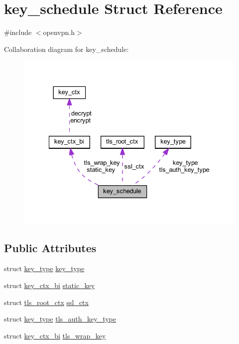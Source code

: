 \hypertarget{structkey__schedule}{}\section{key\+\_\+schedule Struct Reference}
\label{structkey__schedule}


{\ttfamily \#include $<$openvpn.\+h$>$}



Collaboration diagram for key\+\_\+schedule\+:
\nopagebreak
\begin{figure}[H]
\begin{center}
\leavevmode
\includegraphics[width=334pt]{structkey__schedule__coll__graph}
\end{center}
\end{figure}
\subsection*{Public Attributes}
\begin{DoxyCompactItemize}
\item 
struct \hyperlink{structkey__type}{key\+\_\+type} \hyperlink{structkey__schedule_a4a34faf7867d3d6647238e914324a99b}{key\+\_\+type}
\item 
struct \hyperlink{structkey__ctx__bi}{key\+\_\+ctx\+\_\+bi} \hyperlink{structkey__schedule_aea2d2038fbffa038ea608eaf923bb2db}{static\+\_\+key}
\item 
struct \hyperlink{structtls__root__ctx}{tls\+\_\+root\+\_\+ctx} \hyperlink{structkey__schedule_a5e59f0aab5d757ed334039b15682829a}{ssl\+\_\+ctx}
\item 
struct \hyperlink{structkey__type}{key\+\_\+type} \hyperlink{structkey__schedule_a6a3add124db00336ab5c081037ae11fd}{tls\+\_\+auth\+\_\+key\+\_\+type}
\item 
struct \hyperlink{structkey__ctx__bi}{key\+\_\+ctx\+\_\+bi} \hyperlink{structkey__schedule_ad2ce1d97a35d1c487ce7c13f52d900c5}{tls\+\_\+wrap\+\_\+key}
\end{DoxyCompactItemize}


